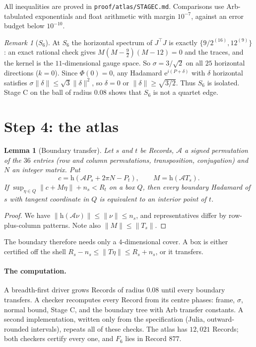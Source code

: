 \documentclass[11pt]{article}
\newtheorem{lemma}[theorem]{Lemma}
\theoremstyle{remark}
\newtheorem{remark}[theorem]{Remark}
\newcommand{\hor}{\mathrm h}
\newcommand{\e}{\mathrm e}
\newcommand{\NRecords}{$12{,}021$}
\newcommand{\Fsix}{$877$}
\begin{document}
All inequalities are proved in \texttt{proof/atlas/STAGEC.md}. Comparisons use Arb-tabulated exponentials and float arithmetic with margin $10^{-7}$, against an error budget below $10^{-10}$.

\begin{remark}[$S_6$]\label{rem:tao}
At $S_6$ the horizontal spectrum of $J^\top J$ is exactly $\{9/2^{(16)},12^{(9)}\}$: an exact rational check gives $M(M-\frac92)(M-12)=0$ and the traces, and the kernel is the $11$-dimensional gauge space. So $\sigma=3/\sqrt2$ on all $25$ horizontal directions ($k=0$). Since $\Phi(0)=0$, any Hadamard $\e^{i(P+\delta)}$ with $\delta$ horizontal satisfies $\sigma\|\delta\|\le\sqrt3\|\delta\|^2$, so $\delta=0$ or $\|\delta\|\ge\sqrt{3/2}$. Thus $S_6$ is isolated. Stage C on the ball of radius $0.08$ shows that $S_6$ is not a quartet edge.
\end{remark}

\section{Step 4: the atlas}

\begin{lemma}[Boundary transfer]\label{lem:transfer}
Let $s$ and $t$ be Records, $\mathcal A$ a signed permutation of the $36$ entries (row and column permutations, transposition, conjugation) and $N$ an integer matrix. Put
\[
 c=\hor(\mathcal AP_s+2\pi N-P_t),\qquad M=\hor(\mathcal AT_s).
\]
If $\sup_{\eta\in Q}\|c+M\eta\|+n_s<R_t$ on a box $Q$, then every boundary Hadamard of $s$ with tangent coordinate in $Q$ is equivalent to an interior point of $t$.
\end{lemma}

\begin{proof}
We have $\|\hor(\mathcal A\nu)\|\le\|\nu\|\le n_s$, and representatives differ by row-plus-column patterns. Note also $\|M\|\le\|T_s\|$.
\end{proof}

The boundary therefore needs only a $4$-dimensional cover. A box is either certified off the shell $R_s-n_s\le\|T\eta\|\le R_s+n_s$, or it transfers.

\paragraph{The computation.} A breadth-first driver grows Records of radius $0.08$ until every boundary transfers. A checker recomputes every Record from its centre phases: frame, $\sigma$, normal bound, Stage C, and the boundary tree with Arb transfer constants. A second implementation, written only from the specification (Julia, outward-rounded intervals), repeats all of these checks. The atlas has \NRecords{} Records; both checkers certify every one, and $F_6$ lies in Record \Fsix.
\end{document}
